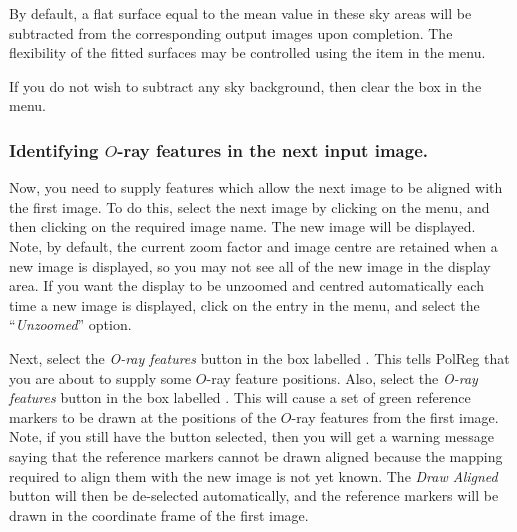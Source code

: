 By default, a flat surface equal to the mean value in these sky areas
will be subtracted from the corresponding output images upon completion.
The flexibility of the fitted surfaces may be controlled using the
 item in the 
 menu.

If you do not wish to subtract any sky background, then clear the 
 box in the 
 menu.

\subsubsection {Identifying $O$-ray features in the next input image.}
Now, you need to supply features which allow the next image to be
aligned with the first image. To do this, select the next image by
clicking on the  menu, and then
clicking on the required image name. The new image will be displayed.
Note, by default, the current zoom factor and image centre are retained
when a new image is displayed, so you may not see all of the new image in
the display area. If you want the display to be unzoomed and centred
automatically each time a new image is displayed, click on the
 entry in the  menu, and select the ``{\em Unzoomed}'' option.

Next, select the {\em O-ray features} button in the box labelled
. This tells PolReg that you are
about to supply some $O$-ray feature positions. Also, select the 
{\em O-ray features} button in the box labelled
. This will cause
a set of green reference markers to be drawn at the positions of the
$O$-ray features from the first image. Note, if you still have the
 button selected, then
you will get a warning message saying that the reference markers cannot
be drawn aligned because the mapping required to align them with the new
image is not yet known. The {\em Draw Aligned} button will then be
de-selected automatically, and the reference markers will be drawn in the
coordinate frame of the first image.

